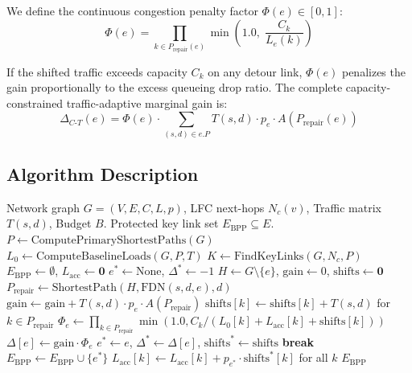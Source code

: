 \documentclass[journal]{IEEEtran}
\begin{document}
We define the continuous congestion penalty factor $\Phi(e) \in [0, 1]$:
\begin{equation}
\Phi(e) = \prod_{k \in P_{\text{repair}}(e)} \min\left(1.0, \; \frac{C_k}{L_e(k)}\right)
\label{eq:penalty}
\end{equation}

If the shifted traffic exceeds capacity $C_k$ on any detour link, $\Phi(e)$ penalizes the gain proportionally to the excess queueing drop ratio. The complete capacity-constrained traffic-adaptive marginal gain is:
\begin{equation}
\Delta_{C\text{-}T}(e) = \Phi(e) \cdot \sum_{(s,d) \in e.P} T(s, d) \cdot p_e \cdot A(P_{\text{repair}}(e))
\label{eq:delta_ct}
\end{equation}

\subsection{Algorithm Description}

\begin{algorithmic}[1]
\REQUIRE Network graph $G=(V, E, C, L, p)$, LFC next-hops $N_c(v)$, Traffic matrix $T(s,d)$, Budget $B$.
\ENSURE Protected key link set $E_{\text{BPP}} \subseteq E$.
\STATE $P \leftarrow \text{ComputePrimaryShortestPaths}(G)$
\STATE $L_0 \leftarrow \text{ComputeBaselineLoads}(G, P, T)$
\STATE $K \leftarrow \text{FindKeyLinks}(G, N_c, P)$
\STATE $E_{\text{BPP}} \leftarrow \emptyset$, $L_{\text{acc}} \leftarrow \mathbf{0}$
    \STATE $e^* \leftarrow \text{None}$, $\Delta^* \leftarrow -1$
        \STATE $H \leftarrow G \setminus \{e\}$, $\text{gain} \leftarrow 0$, $\text{shifts} \leftarrow \mathbf{0}$
            \STATE $P_{\text{repair}} \leftarrow \text{ShortestPath}(H, \text{FDN}(s,d,e), d)$
                \STATE $\text{gain} \leftarrow \text{gain} + T(s, d) \cdot p_e \cdot A(P_{\text{repair}})$
                \STATE $\text{shifts}[k] \leftarrow \text{shifts}[k] + T(s, d)$ for $k \in P_{\text{repair}}$
            \ENDIF
        \ENDFOR
        \STATE $\Phi_e \leftarrow \prod_{k \in P_{\text{repair}}} \min(1.0, C_k / (L_0[k] + L_{\text{acc}}[k] + \text{shifts}[k]))$
        \STATE $\Delta[e] \leftarrow \text{gain} \cdot \Phi_e$
        \IF{$\Delta[e] > \Delta^*$}
            \STATE $e^* \leftarrow e$, $\Delta^* \leftarrow \Delta[e]$, $\text{shifts}^* \leftarrow \text{shifts}$
        \ENDIF
    \ENDFOR
        \STATE \textbf{break}
    \ENDIF
    \STATE $E_{\text{BPP}} \leftarrow E_{\text{BPP}} \cup \{e^*\}$
    \STATE $L_{\text{acc}}[k] \leftarrow L_{\text{acc}}[k] + p_{e^*} \cdot \text{shifts}^*[k]$ for all $k$
\ENDWHILE
\RETURN $E_{\text{BPP}}$
\end{algorithmic}
\end{document}
